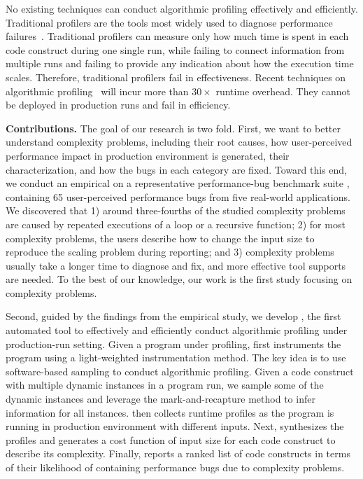 No existing techniques can conduct algorithmic profiling effectively and efficiently. 
Traditional profilers are the tools most widely used to
diagnose performance failures~\cite{gprof,oprofile}.
Traditional profilers can measure only how much time 
is spent in each code construct during one single run,
while failing to connect information from multiple runs
and failing to provide any indication about how the execution time scales.
Therefore, traditional profilers fail in effectiveness.
Recent techniques on algorithmic 
profiling~\cite{Aprof1,Aprof2,AlgoProf} will incur more than $30\times$ runtime overhead.
They cannot be deployed in production runs and fail in efficiency. 

\fi



\textbf{Contributions.}
\label{sec:con}
%
The goal of our research is two fold. First, we want to better 
understand  complexity problems, including 
their root causes, how user-perceived performance impact 
in production environment is generated,
their characterization, and how the bugs in each category are
fixed.  Toward this end, 
we conduct an empirical on a  representative
performance-bug benchmark suite \cite{PerfBug,SongOOPSLA2014},
containing 65 user-perceived   performance bugs from five
real-world applications.  We discovered that 
1) around three-fourths of the studied complexity problems are
caused by repeated executions of a loop or a recursive function;
2) for most complexity problems,
the users describe how to change the input size to reproduce the scaling problem during reporting;
and 3) complexity problems usually take a longer time to diagnose and fix,
and more effective tool supports are needed.
To the best of our knowledge, our work is the first study focusing on complexity problems.



Second, guided by the findings from the empirical
study, we develop \Tool, the first automated tool to effectively and efficiently 
conduct algorithmic profiling  under production-run setting.
Given a program under profiling, \Tool first instruments the program
using a light-weighted instrumentation method. 
The key idea is to use software-based sampling to conduct algorithmic profiling.
Given a code construct with multiple dynamic instances in a program run,
we sample some of the dynamic instances and leverage the mark-and-recapture
method \citep{mark-recapture} to infer information for all instances.
\Tool then collects runtime profiles as the program is running
in production environment with different inputs.
Next, \Tool synthesizes the profiles and generates a cost function of input size
for each code construct to describe its complexity. 
Finally, \Tool  reports a ranked list of code constructs in terms of their likelihood
of containing performance bugs due to complexity problems.  


